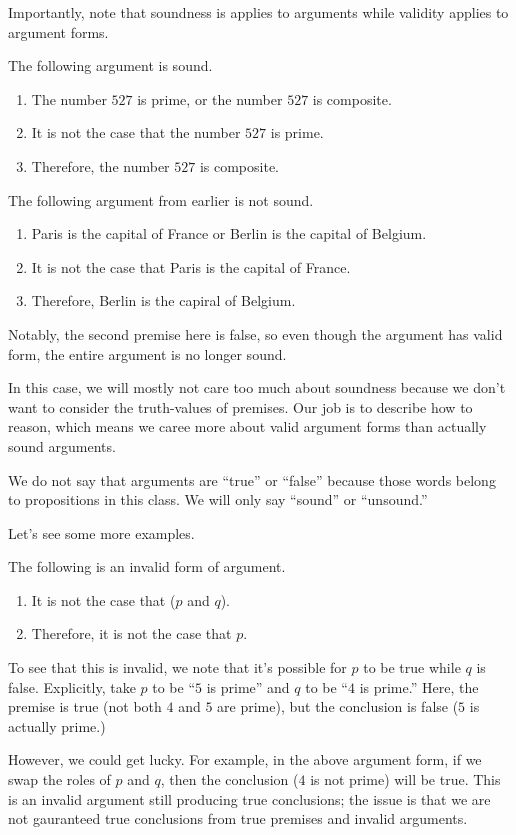 Importantly, note that soundness is applies to arguments while validity applies to argument forms.
\begin{example}
	The following argument is sound.
	\begin{enumerate}
		\item The number $527$ is prime, or the number $527$ is composite.
		\item It is not the case that the number $527$ is prime.
		\item Therefore, the number $527$ is composite.
	\end{enumerate}
\end{example}
\begin{nex}
	The following argument from earlier is not sound.
	\begin{enumerate}
		\item Paris is the capital of France or Berlin is the capital of Belgium.
		\item It is not the case that Paris is the capital of France.
		\item Therefore, Berlin is the capiral of Belgium.
	\end{enumerate}
	Notably, the second premise here is false, so even though the argument has valid form, the entire argument is no longer sound.
\end{nex}
In this case, we will mostly not care too much about soundness because we don't want to consider the truth-values of premises. Our job is to describe how to reason, which means we caree more about valid argument forms than actually sound arguments.
\begin{remark}
	We do not say that arguments are ``true'' or ``false'' because those words belong to propositions in this class. We will only say ``sound'' or ``unsound.''
\end{remark}
Let's see some more examples.
\begin{nex}
	The following is an invalid form of argument.
	\begin{enumerate}
		\item It is not the case that ($p$ and $q$).
		\item Therefore, it is not the case that $p$.
	\end{enumerate}
	To see that this is invalid, we note that it's possible for $p$ to be true while $q$ is false. Explicitly, take $p$ to be ``$5$ is prime'' and $q$ to be ``$4$ is prime.'' Here, the premise is true (not both $4$ and $5$ are prime), but the conclusion is false ($5$ is actually prime.)
\end{nex}
However, we could get lucky. For example, in the above argument form, if we swap the roles of $p$ and $q$, then the conclusion ($4$ is not prime) will be true. This is an invalid argument still producing true conclusions; the issue is that we are not gauranteed true conclusions from true premises and invalid arguments.

